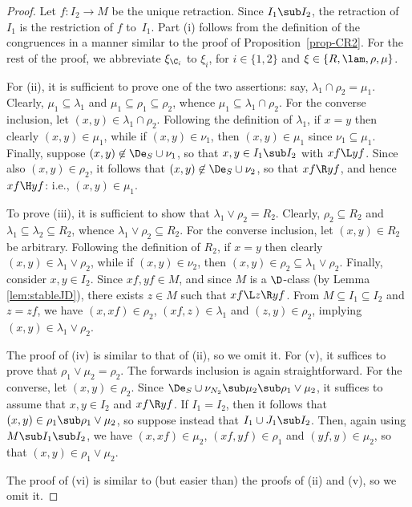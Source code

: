 \begin{proof}
Let $f:I_2\to M$ be the unique retraction.  Since $I_1\sub
  I_2$, the retraction of $I_1$ is the restriction of $f$ to~$I_1$.
  Part (i) follows from the definition of the congruences in a manner
  similar to the proof of Proposition~\ref{prop-CR2}.  For the rest of the proof, we abbreviate $\xi_{\C_i}$ to $\xi_i$, for $i\in\{1,2\}$ and $\xi\in\{R,\lam,\rho,\mu\}$.

For (ii), it is sufficient to prove one of the two assertions: say, $\lambda_1\cap \rho_2=\mu_1$.
Clearly, $\mu_1\subseteq \lambda_1$ and $\mu_1\subseteq \rho_1\subseteq \rho_2$, whence $\mu_1\subseteq \lambda_1\cap\rho_2$.
For the converse inclusion, let $(x,y)\in \lambda_1\cap\rho_2$.
Following the definition of $\lambda_1$, if $x=y$ then clearly $(x,y)\in \mu_1$, while if $(x,y)\in\nu_1$, then $(x,y)\in \mu_1$ since $\nu_1\subseteq\mu_1$.
Finally, suppose $(x,y)\not\in\De_S\cup\nu_1$, so that $x,y\in I_1\sub I_2$ with $xf\L yf$.
%
Since also $(x,y)\in\rho_2$, it follows that $(x,y)\not\in\De_S\cup\nu_2$, so that $xf\R yf$, and hence $xf\H yf$: i.e., $(x,y)\in\mu_1$.

To prove (iii), it is sufficient to show that $\lambda_1\vee\rho_2=R_2$.
Clearly, $\rho_2\subseteq R_2$ and $\lambda_1\subseteq \lambda_2\subseteq R_2$, whence $\lambda_1\vee\rho_2\subseteq R_2$.
For the converse inclusion, let $(x,y)\in R_2$ be arbitrary.
Following the definition of $R_2$, if $x=y$ then clearly $(x,y)\in \lambda_1\vee\rho_2$, while if $(x,y)\in \nu_2$, then
$(x,y)\in \rho_2\subseteq \lambda_1\vee\rho_2$.
Finally, consider $x,y\in I_2$.
Since $xf,yf\in M$, and since $M$ is a ${\D}$-class (by Lemma \ref{lem:stableJD}), there exists
$z\in M$ such that $xf\L z\R yf$.
From $M\subseteq I_1\subseteq I_2$ and $z=zf$, we have $(x,xf)\in\rho_2$,
$(xf,z)\in \lambda_1$ and $(z,y)\in \rho_2$, implying $(x,y)\in\lambda_1\vee\rho_2$. %

The proof of (iv) is similar to that of (ii), so we omit it.  For (v), it suffices to prove that $\rho_1\vee\mu_2=\rho_2$.  The forwards inclusion is again straightforward.  For the converse, let $(x,y)\in\rho_2$.  Since $\De_S\cup\nu_{N_2}\sub\mu_2\sub\rho_1\vee\mu_2$, it suffices to assume that $x,y\in I_2$ and $xf\R yf$.  If $I_1=I_2$, then it follows that $(x,y)\in\rho_1\sub\rho_1\vee\mu_2$, so suppose instead that $I_1\cup J_1\sub I_2$.  Then, again using $M\sub I_1\sub I_2$, we have $(x,xf)\in\mu_2$, $(xf,yf)\in\rho_1$ and $(yf,y)\in\mu_2$, so that $(x,y)\in\rho_1\vee\mu_2$.

The proof of (vi) is similar to (but easier than) the proofs of (ii) and (v), so we omit it.
\end{proof}

